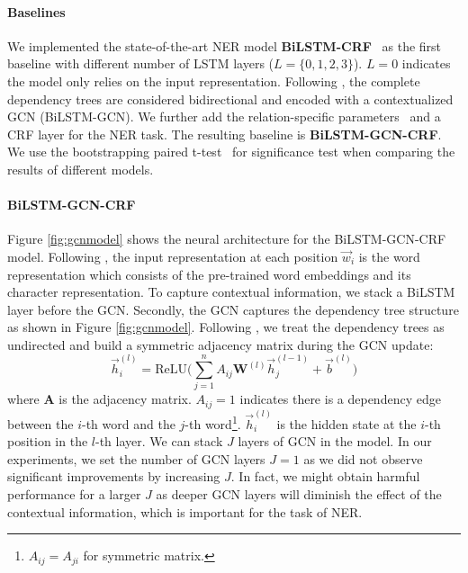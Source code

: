\paragraph{Baselines}
We implemented the state-of-the-art NER model \textbf{BiLSTM-CRF}~\cite{lample2016neural} as the first baseline with different number of LSTM layers ($L=\{0, 1,2,3\}$). 
$L=0$ indicates the model only relies on the input representation. 
Following \citet{zhang2018graph}, the complete dependency trees are considered bidirectional and encoded with a contextualized GCN (BiLSTM-GCN). 
We further add the relation-specific parameters~\cite{marcheggiani2017encoding} and a CRF layer for the NER task. 
The resulting baseline is \textbf{BiLSTM-GCN-CRF}. 
We use the bootstrapping paired t-test~\cite{berg2012empirical} for significance test when comparing the results of different models.

\paragraph{BiLSTM-GCN-CRF}
Figure \ref{fig:gcnmodel} shows the neural architecture for the BiLSTM-GCN-CRF model. 
Following \citet{zhang2018graph}, the input representation at each position $\vec{w}_i$ is the word representation which consists of the pre-trained word embeddings and its character representation. 
To capture contextual information, we stack a BiLSTM layer before the GCN. 
Secondly, the GCN captures the dependency tree structure as shown in Figure \ref{fig:gcnmodel}. 
Following \citet{zhang2018graph}, we treat the dependency trees as undirected and build a symmetric adjacency matrix during the GCN update:
\begin{equation}
\vec{h}_i^{(l)}
=
\text{ReLU}
\Big(
\sum_{j=1}^{n}
A_{ij}
\mathbf{W}^{(l)} \vec{h}_j^{(l-1)}
+
\vec{b}^{(l)}
\Big)
\label{equ:gcn}
\end{equation}
where $\mathbf{A}$ is the adjacency matrix. $A_{ij} = 1$ indicates there is a dependency edge between the $i$-th word and the $j$-th word\footnote{$A_{ij} = A_{ji}$ for symmetric matrix. }. 
$\vec{h}_i^{(l)}$ is the hidden state at the $i$-th position in the $l$-th layer. 
We can stack $J$ layers of GCN in the model. 
In our experiments, we set the number of GCN layers $J = 1$ as we did not observe significant improvements by increasing $J$. 
In fact, we might obtain harmful performance for a larger $J$ as deeper GCN layers will diminish the effect of the contextual information, which is important for the task of NER. 

